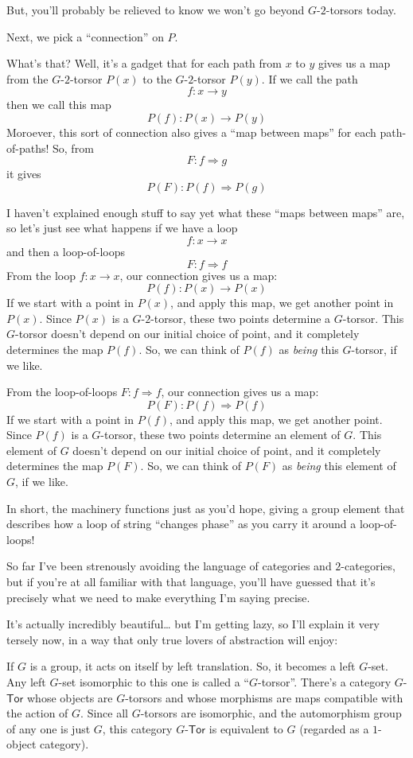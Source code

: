 \documentclass{article}
\begin{document}
But, you'll probably be relieved to know we won't go beyond
\(G\)-\(2\)-torsors today.

Next, we pick a ``connection'' on \(P\).

What's that? Well, it's a gadget that for each path from \(x\) to \(y\)
gives us a map from the \(G\)-\(2\)-torsor \(P(x)\) to the
\(G\)-\(2\)-torsor \(P(y)\). If we call the path \[f\colon x \to y\]
then we call this map \[P(f)\colon P(x) \to P(y)\] Moroever, this sort
of connection also gives a ``map between maps'' for each path-of-paths!
So, from \[F\colon f \Rightarrow g\] it gives
\[P(F)\colon P(f) \Rightarrow P(g)\]

I haven't explained enough stuff to say yet what these ``maps between
maps'' are, so let's just see what happens if we have a loop
\[f\colon x \to x\] and then a loop-of-loops \[F\colon f \Rightarrow f\]
From the loop \(f\colon x \to x\), our connection gives us a map:
\[P(f)\colon P(x) \to P(x)\] If we start with a point in \(P(x)\), and
apply this map, we get another point in \(P(x)\). Since \(P(x)\) is a
\(G\)-\(2\)-torsor, these two points determine a \(G\)-torsor. This
\(G\)-torsor doesn't depend on our initial choice of point, and it
completely determines the map \(P(f)\). So, we can think of \(P(f)\) as
\emph{being} this \(G\)-torsor, if we like.

From the loop-of-loops \(F\colon f \Rightarrow f\), our connection gives
us a map: \[P(F)\colon P(f) \Rightarrow P(f)\] If we start with a point
in \(P(f)\), and apply this map, we get another point. Since \(P(f)\) is
a \(G\)-torsor, these two points determine an element of \(G\). This
element of \(G\) doesn't depend on our initial choice of point, and it
completely determines the map \(P(F)\). So, we can think of \(P(F)\) as
\emph{being} this element of \(G\), if we like.

In short, the machinery functions just as you'd hope, giving a group
element that describes how a loop of string ``changes phase'' as you
carry it around a loop-of-loops!

So far I've been strenously avoiding the language of categories and
\(2\)-categories, but if you're at all familiar with that language,
you'll have guessed that it's precisely what we need to make everything
I'm saying precise.

It's actually incredibly beautiful\ldots{} but I'm getting lazy, so I'll
explain it very tersely now, in a way that only true lovers of
abstraction will enjoy:

If \(G\) is a group, it acts on itself by left translation. So, it
becomes a left \(G\)-set. Any left \(G\)-set isomorphic to this one is
called a ``\(G\)-torsor''. There's a category \(G\)-\(\mathsf{Tor}\)
whose objects are \(G\)-torsors and whose morphisms are maps compatible
with the action of \(G\). Since all \(G\)-torsors are isomorphic, and
the automorphism group of any one is just \(G\), this category
\(G\)-\(\mathsf{Tor}\) is equivalent to \(G\) (regarded as a
\(1\)-object category).
\end{document}
